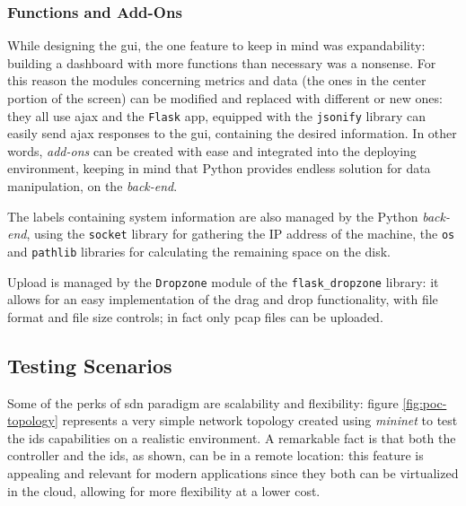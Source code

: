 \subsubsection{Functions and Add-Ons}
\label{subsubsec:functions}

While designing the \gls{gui}, the one feature to keep in mind was expandability: building a dashboard with more functions than necessary was a nonsense. For this reason the modules concerning metrics and data (the ones in the center portion of the screen) can be modified and replaced with different or new ones: they all use \gls{ajax} and the \texttt{Flask} app, equipped with the \texttt{jsonify} library can easily send \gls{ajax} responses to the \gls{gui}, containing the desired information. In other words, \textit{add-ons} can be created with ease and integrated into the deploying environment, keeping in mind that Python provides endless solution for data manipulation, on the \textit{back-end}.
\par The labels containing system information are also managed by the Python \textit{back-end}, using the \texttt{socket} library for gathering the IP address of the machine, the \texttt{os} and \texttt{pathlib} libraries for calculating the remaining space on the disk.
\par Upload is managed by the \texttt{Dropzone} module of the \texttt{flask\_dropzone} library: it allows for an easy implementation of the drag and drop functionality, with file format and file size controls; in fact only \gls{pcap} files can be uploaded.


\subsection{Testing Scenarios}
\label{subsec:testing-scenarios}

Some of the perks of \gls{sdn} paradigm are scalability and flexibility: figure \ref{fig:poc-topology} represents a very simple network topology created using \textit{mininet} to test the \gls{ids} capabilities on a realistic environment. A remarkable fact is that both the controller and the \gls{ids}, as shown, can be in a remote location: this feature is appealing and relevant for modern applications since they both can be virtualized in the cloud, allowing for more flexibility at a lower cost.

